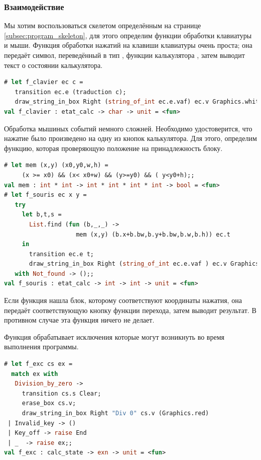 \subsubsection{Взаимодействие}

Мы хотим воспользоваться скелетом определённым на странице 
\ref{subsec:program_skeleton}, для этого определим функции обработки клавиатуры 
и мыши. Функция обработки нажатий на клавиши клавиатуры очень проста; она 
передаёт символ, переведённый в тип , функции калькулятора 
, затем выводит текст о состоянии калькулятора.

\begin{lstlisting}[language=OCaml]
# let f_clavier ec c = 
   transition ec.e (traduction c);
   draw_string_in_box Right (string_of_int ec.e.vaf) ec.v Graphics.white ;;
val f_clavier : etat_calc -> char -> unit = <fun>
\end{lstlisting}

Обработка мышиных событий немного сложней. Необходимо удостоверится, что нажатие 
было произведено на одну из кнопок калькулятора. Для этого, определим функцию, 
которая проверяющую положение на принадлежность блоку.

\begin{lstlisting}[language=OCaml]
# let mem (x,y) (x0,y0,w,h) = 
     (x >= x0) && (x< x0+w) && (y>=y0) && ( y<y0+h);;
val mem : int * int -> int * int * int * int -> bool = <fun>
# let f_souris ec x y = 
   try 
     let b,t,s = 
       List.find (fun (b,_,_) -> 
                    mem (x,y) (b.x+b.bw,b.y+b.bw,b.w,b.h)) ec.t
     in 
       transition ec.e t;
       draw_string_in_box Right (string_of_int ec.e.vaf ) ec.v Graphics.white
   with Not_found -> ();;
val f_souris : etat_calc -> int -> int -> unit = <fun>
\end{lstlisting}

Если функция  нашла блок, которому соответствуют координаты 
нажатия, она передаёт соответствующую кнопку функции перехода, затем выводит 
результат. В противном случае эта функция ничего не делает.

Функция  обрабатывает исключения которые могут возникнуть во время 
выполнения программы.

\begin{lstlisting}[language=OCaml]
# let f_exc cs ex = 
  match ex with 
   Division_by_zero -> 
     transition cs.s Clear;
     erase_box cs.v;
     draw_string_in_box Right "Div 0" cs.v (Graphics.red)
 | Invalid_key -> ()
 | Key_off -> raise End
 | _  -> raise ex;;
val f_exc : calc_state -> exn -> unit = <fun>
\end{lstlisting}

